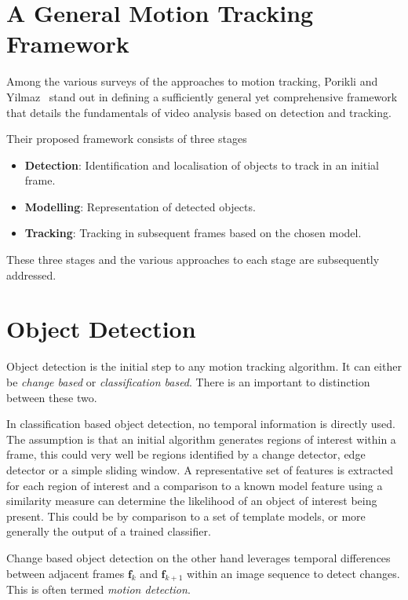 \section{A General Motion Tracking Framework}\label{literature_review_framework}
Among the various surveys of the approaches to motion tracking, Porikli and
Yilmaz~\cite{Porikli2012} stand out in defining a sufficiently general yet comprehensive
framework that details the fundamentals of video analysis based on detection
and tracking. 

Their proposed framework consists of three stages
\begin{itemize}
    \item \textbf{Detection}: Identification and localisation of objects to
        track in an initial frame.
    \item \textbf{Modelling}: Representation of detected objects.
    \item \textbf{Tracking}: Tracking in subsequent frames based on the chosen
        model.
\end{itemize}

These three stages and the various approaches to each stage are subsequently addressed.

\section{Object Detection}\label{literature_review_object_detection}
Object detection is the initial step to any motion tracking algorithm. It can
either be \textit{change based} or \textit{classification based}. There is an
important to distinction between these two.

In classification based object detection, no temporal information is directly
used. The assumption is that an initial algorithm generates regions of interest
within a frame, this could very well be regions identified by a change detector,
edge detector or a simple sliding window. A representative set of features is
extracted for each region of interest and a comparison to a known model feature
using a similarity measure can determine the likelihood of an object of interest
being present. 
This could be by comparison to a set of template models, or more generally the
output of a trained classifier.

Change based object detection on the other hand leverages temporal differences
between adjacent frames $\mathbf{f}_k$ and $\mathbf{f}_{k+1}$ within an image
sequence to detect changes. This is often termed \textit{motion detection}. 

